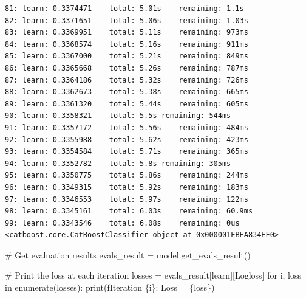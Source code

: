 \documentclass[
  letterpaper,
  DIV=11,
  numbers=noendperiod]{scrartcl}
\newenvironment{Shaded}{\begin{snugshade}}{\end{snugshade}}
\newcommand{\BuiltInTok}[1]{\textcolor[rgb]{0.00,0.23,0.31}{#1}}
\newcommand{\CommentTok}[1]{\textcolor[rgb]{0.37,0.37,0.37}{#1}}
\newcommand{\ControlFlowTok}[1]{\textcolor[rgb]{0.00,0.23,0.31}{#1}}
\newcommand{\KeywordTok}[1]{\textcolor[rgb]{0.00,0.23,0.31}{#1}}
\newcommand{\NormalTok}[1]{\textcolor[rgb]{0.00,0.23,0.31}{#1}}
\newcommand{\OperatorTok}[1]{\textcolor[rgb]{0.37,0.37,0.37}{#1}}
\newcommand{\SpecialCharTok}[1]{\textcolor[rgb]{0.37,0.37,0.37}{#1}}
\newcommand{\SpecialStringTok}[1]{\textcolor[rgb]{0.13,0.47,0.30}{#1}}
\newcommand{\StringTok}[1]{\textcolor[rgb]{0.13,0.47,0.30}{#1}}
\begin{document}
\begin{verbatim}
81: learn: 0.3374471    total: 5.01s    remaining: 1.1s
82: learn: 0.3371651    total: 5.06s    remaining: 1.03s
83: learn: 0.3369951    total: 5.11s    remaining: 973ms
84: learn: 0.3368574    total: 5.16s    remaining: 911ms
85: learn: 0.3367000    total: 5.21s    remaining: 849ms
86: learn: 0.3365668    total: 5.26s    remaining: 787ms
87: learn: 0.3364186    total: 5.32s    remaining: 726ms
88: learn: 0.3362673    total: 5.38s    remaining: 665ms
89: learn: 0.3361320    total: 5.44s    remaining: 605ms
90: learn: 0.3358321    total: 5.5s remaining: 544ms
91: learn: 0.3357172    total: 5.56s    remaining: 484ms
92: learn: 0.3355988    total: 5.62s    remaining: 423ms
93: learn: 0.3354584    total: 5.71s    remaining: 365ms
94: learn: 0.3352782    total: 5.8s remaining: 305ms
95: learn: 0.3350775    total: 5.86s    remaining: 244ms
96: learn: 0.3349315    total: 5.92s    remaining: 183ms
97: learn: 0.3346553    total: 5.97s    remaining: 122ms
98: learn: 0.3345161    total: 6.03s    remaining: 60.9ms
99: learn: 0.3343546    total: 6.08s    remaining: 0us
<catboost.core.CatBoostClassifier object at 0x000001EBEA834EF0>
\end{verbatim}

\begin{Shaded}
\begin{Highlighting}[]
\CommentTok{\# Get evaluation results}
\NormalTok{evals\_result }\OperatorTok{=}\NormalTok{ model.get\_evals\_result()}

\CommentTok{\# Print the loss at each iteration}
\NormalTok{losses }\OperatorTok{=}\NormalTok{ evals\_result[}\StringTok{\textquotesingle{}learn\textquotesingle{}}\NormalTok{][}\StringTok{\textquotesingle{}Logloss\textquotesingle{}}\NormalTok{]}
\ControlFlowTok{for}\NormalTok{ i, loss }\KeywordTok{in} \BuiltInTok{enumerate}\NormalTok{(losses):}
    \BuiltInTok{print}\NormalTok{(}\SpecialStringTok{f\textquotesingle{}Iteration }\SpecialCharTok{\{}\NormalTok{i}\SpecialCharTok{\}}\SpecialStringTok{: Loss = }\SpecialCharTok{\{}\NormalTok{loss}\SpecialCharTok{\}}\SpecialStringTok{\textquotesingle{}}\NormalTok{)}
\end{Highlighting}
\end{Shaded}
\end{document}
